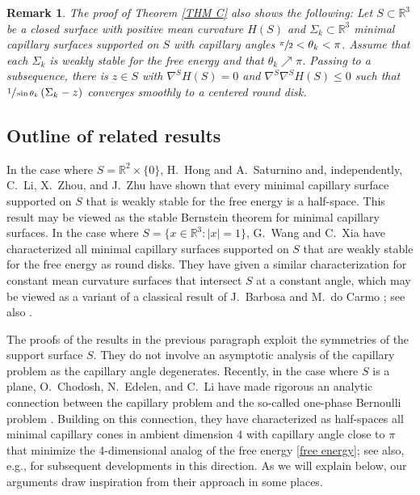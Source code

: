 \documentclass[11pt]{amsart}
\newtheorem{rema}[prop]{Remark}
\begin{document}
\begin{rema} 
	The proof of Theorem \ref{THM C} also shows the following: Let $S\subset \mathbb{R}^3$ be a closed surface with positive mean curvature $H(S)$ and $\Sigma_k\subset \mathbb{R}^3$  minimal capillary surfaces supported on $S$ with capillary angles $\sfrac{\pi}{2}<\theta_k<\pi$. Assume that each $\Sigma_k$ is  weakly stable for the free energy and that $\theta_k\nearrow \pi$. Passing to a subsequence, there is $z\in S$ with $\nabla^SH(S)=0$ and $\nabla^S\nabla^S H(S)\leq 0$ such that $\sfrac{1}{\sin\theta_k}\,(\Sigma_k-z)$ converges smoothly to  a centered round disk.
\end{rema}

\subsection*{Outline of related results}
In the case where $S=\mathbb{R}^2\times \{0\}$, H.~Hong and A.~Saturnino \cite{HongSaturnino} and, independently, C.~Li, X.~Zhou, and J.~Zhu \cite{LiZhouZhu} have shown that every minimal capillary surface supported on $S$ that is weakly stable for the free energy is a half-space. This result may be viewed as  the stable Bernstein theorem \cite{Bernstein1,Bernstein2} for minimal capillary surfaces. In the case where $S=\{x\in \mathbb{R}^3:|x|=1\}$, G.~Wang and C.~Xia \cite{WangXia} have characterized all minimal capillary surfaces supported on $S$ that are weakly stable for the free energy as round disks. They have given a similar characterization for constant mean curvature surfaces that intersect $S$ at a constant angle, which may be viewed as a variant of a classical result of J.~Barbosa and M.~do Carmo \cite{BarbosadoCarmo}; see also \cite{DeRosa}.

The proofs of the results in the previous paragraph  exploit the  symmetries of the support surface $S$. They do not involve  an asymptotic analysis of the capillary problem as the capillary angle degenerates.    Recently, in the case where $S$ is a plane, O.~Chodosh, N.~Edelen, and C.~Li \cite{chodoshedelenli} have made rigorous an analytic connection between the capillary problem   and the so-called one-phase Bernoulli problem \cite{AltCafarelli}. Building on this connection, they have characterized as half-spaces all minimal capillary cones in ambient dimension $4$  with capillary angle  close to $\pi$ that minimize the 4-dimensional analog of the free energy \eqref{free energy}; see also, e.g.,  \cite{pacati2025some,chodosh2025weiss,Tsiamis1,Tsiamis2} for subsequent developments in this direction. As we will explain below, our arguments draw inspiration from their approach in some places. 
\end{document}
